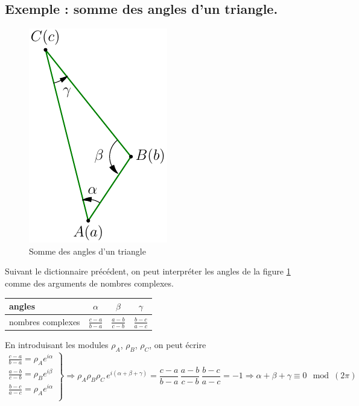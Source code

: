 \subsection{Exemple : somme des angles d'un triangle.}
\begin{figure}[h]
  \centering
  \includegraphics{./C2002_3.pdf}
  \caption{Somme des angles d'un triangle}
  \label{fig:C2002_3}
\end{figure}
Suivant le dictionnaire précédent, on peut interpréter les angles de la figure \ref{fig:C2002_3} comme des arguments de nombres complexes.
\renewcommand{\arraystretch}{1.8}
\begin{tabular}{|l|c|c|c|} \hline
angles            & $\alpha$          & $\beta$           & $\gamma$ \\ \hline
nombres complexes & $\frac{c-a}{b-a}$ & $\frac{a-b}{c-b}$ & $\frac{b-c}{a-c}$ \\ \hline
\end{tabular}

En introduisant les modules $\rho_A$, $\rho_B$, $\rho_C$, on peut écrire
\begin{displaymath}
\left. 
\begin{aligned}
\frac{c-a}{b-a} = \rho_A e^{i\alpha} \\
\frac{a-b}{c-b} = \rho_B e^{i\beta} \\
\frac{b-c}{a-c} = \rho_A e^{i\alpha} \\
\end{aligned}
\right\rbrace 
\Rightarrow
\rho_A \rho_B \rho_C \, e^{i(\alpha + \beta + \gamma)} = \frac{c-a}{b-a}\,\frac{a-b}{c-b}\,\frac{b-c}{a-c} = -1
\Rightarrow \alpha + \beta + \gamma \equiv 0 \mod (2\pi)
\end{displaymath}


